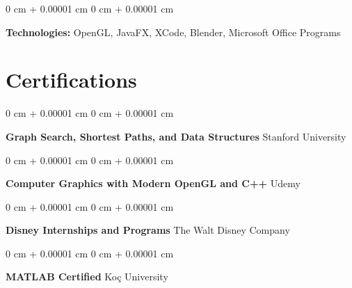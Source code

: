 \documentclass[10pt, letterpaper]{article}
\newenvironment{onecolentry}{
    \begin{adjustwidth}{
        0 cm + 0.00001 cm
    }{
        0 cm + 0.00001 cm
    }
}{
    \end{adjustwidth}
} %
\begin{document}
        \vspace{0.2 cm}

        \begin{onecolentry}
            \textbf{
            Technologies:} OpenGL, JavaFX, XCode, Blender, Microsoft Office Programs
        \end{onecolentry}


    
    \section{Certifications}



        
        \begin{onecolentry}
            \textbf{
            Graph Search, Shortest Paths, and Data Structures} Stanford University  \end{onecolentry}

        \vspace{0.2 cm}

        \begin{onecolentry}
            \textbf{
            Computer Graphics with Modern OpenGL and C++} Udemy
        \end{onecolentry}

        \vspace{0.2 cm}

        \begin{onecolentry}
            \textbf{
            Disney Internships and Programs} The Walt Disney Company
        \end{onecolentry}

                \vspace{0.2 cm}

        \begin{onecolentry}
            \textbf{
            MATLAB Certified} Koç University
        \end{onecolentry}


    
\end{document}

